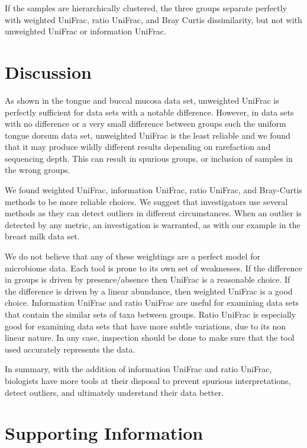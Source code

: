 \documentclass[10pt,letterpaper]{article}
\begin{document}
If the samples are hierarchically clustered, the three groups separate perfectly with weighted UniFrac, ratio UniFrac, and  Bray Curtis dissimilarity, but not with unweighted UniFrac or information UniFrac.

\FloatBarrier

\section*{Discussion}
As shown in the tongue and buccal mucosa data set, unweighted UniFrac is perfectly sufficient for data sets with a notable difference. However, in data sets with no difference or a very small difference between groups such the uniform tongue dorsum data set, unweighted UniFrac is the least reliable and we found that it may produce wildly different results depending on rarefaction and sequencing depth. This can result in spurious groups, or inclusion of samples in the wrong groups.

We found weighted UniFrac, information UniFrac, ratio UniFrac, and Bray-Curtis methods to be more reliable choices. We suggest that investigators use several methods as they can detect outliers in different circumstances. When an outlier is detected by any metric, an investigation is warranted, as with our example in the breast milk data set.

We do not believe that any of these weightings are a perfect model for microbiome data. Each tool is prone to its own set of weaknesses. If the difference in groups is driven by presence/absence then UniFrac is a reasonable choice. If the difference is driven by a linear abundance, then weighted UniFrac is a good choice. Information UniFrac and ratio UniFrac are useful for examining data sets that contain the similar sets of taxa between groups. Ratio UniFrac is especially good for examining data sets that have more subtle variations, due to its non linear nature. In any case, inspection should be done to make sure that the tool used accurately represents the data.

In summary, with the addition of information UniFrac and ratio UniFrac, biologists have more tools at their disposal to prevent spurious interpretations, detect outliers, and ultimately understand their data better.

\section*{Supporting Information}
\end{document}
